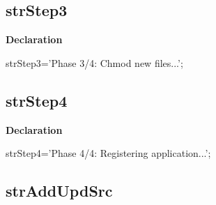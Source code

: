 \documentclass{report}
\newif\ifpdf
\begin{document}
\subsection*{strStep3}
\fi
\label{trstrings-strStep3}
\begin{list}{}{
\setlength{\itemindent}{0cm}
\setlength{\listparindent}{0cm}
\setlength{\leftmargin}{\evensidemargin}
\addtolength{\leftmargin}{\tmplength}
\settowidth{\labelsep}{X}
\addtolength{\leftmargin}{\labelsep}
\setlength{\labelwidth}{\tmplength}
}
\item[\textbf{Declaration}\hfill]
\ifpdf
\begin{flushleft}
\fi
\begin{ttfamily}
strStep3='Phase 3/4: Chmod new files...';\end{ttfamily}

\ifpdf
\end{flushleft}
\fi

\end{list}
\ifpdf
\subsection*{\large{\textbf{strStep4}}\normalsize\hspace{1ex}\hrulefill}
\else
\subsection*{strStep4}
\fi
\label{trstrings-strStep4}
\begin{list}{}{
\setlength{\itemindent}{0cm}
\setlength{\listparindent}{0cm}
\setlength{\leftmargin}{\evensidemargin}
\addtolength{\leftmargin}{\tmplength}
\settowidth{\labelsep}{X}
\addtolength{\leftmargin}{\labelsep}
\setlength{\labelwidth}{\tmplength}
}
\item[\textbf{Declaration}\hfill]
\ifpdf
\begin{flushleft}
\fi
\begin{ttfamily}
strStep4='Phase 4/4: Registering application...';\end{ttfamily}

\ifpdf
\end{flushleft}
\fi

\end{list}
\ifpdf
\subsection*{\large{\textbf{strAddUpdSrc}}\normalsize\hspace{1ex}\hrulefill}
\else
\end{document}
